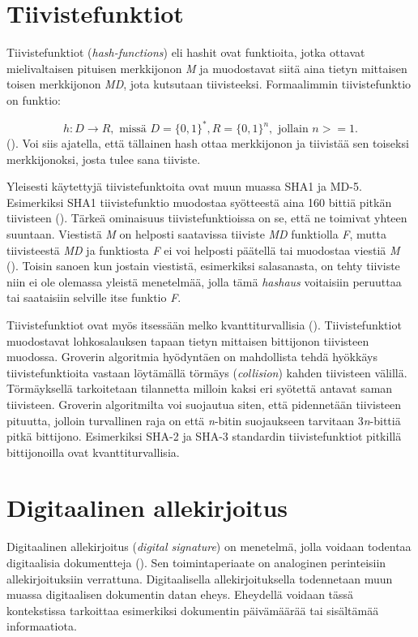  \section{Tiivistefunktiot}
 Tiivistefunktiot (\emph{hash-functions}) eli hashit  ovat funktioita, jotka ottavat mielivaltaisen pituisen merkkijonon \emph{M} ja muodostavat siitä aina tietyn mittaisen toisen merkkijonon \emph{MD}, jota kutsutaan tiivisteeksi. Formaalimmin tiivistefunktio on funktio:
 
 \[h: D \to R, \text{ missä } D = \big\{0,1\big\}^{*}, R = \big\{0,1\big\}^{n}, \text{ jollain } n >= 1.\] (\cite{sobti2012cryptographic}). Voi siis ajatella, että tällainen hash ottaa merkkijonon ja tiivistää sen toiseksi merkkijonoksi, josta tulee sana tiiviste.
 
 Yleisesti käytettyjä tiivistefunktoita ovat muun muassa SHA1 ja MD-5. Esimerkiksi SHA1 tiivistefunktio muodostaa syötteestä aina 160 bittiä pitkän tiivisteen (\cite{bellare2005introduction}). Tärkeä ominaisuus tiivistefunktioissa on se, että ne toimivat yhteen suuntaan. Viestistä \emph{M} on helposti saatavissa tiiviste \emph{MD} funktiolla \emph{F}, mutta tiivisteestä \emph{MD} ja funktiosta \emph{F} ei voi helposti päätellä tai muodostaa viestiä \emph{M} (\cite{bakhtiari1995cryptographic}). Toisin sanoen kun jostain viestistä, esimerkiksi salasanasta, on tehty tiiviste niin ei ole olemassa yleistä menetelmää, jolla tämä \emph{hashaus} voitaisiin peruuttaa tai saataisiin selville itse funktio \emph{F}.
 
 Tiivistefunktiot ovat myös itsessään melko kvanttiturvallisia (\cite{mavroeidis2018impact}). Tiivistefunktiot muodostavat lohkosalauksen tapaan tietyn mittaisen bittijonon tiivisteen muodossa. Groverin algoritmia hyödyntäen on mahdollista tehdä hyökkäys tiivistefunktioita vastaan löytämällä törmäys (\emph{collision}) kahden tiivisteen välillä. Törmäyksellä tarkoitetaan tilannetta milloin kaksi eri syötettä antavat saman tiivisteen. Groverin algoritmilta voi suojautua siten, että pidennetään tiivisteen pituutta, jolloin turvallinen raja on että \emph{n}-bitin suojaukseen tarvitaan 3\emph{n}-bittiä pitkä bittijono. Esimerkiksi SHA-2 ja SHA-3 standardin tiivistefunktiot pitkillä bittijonoilla ovat kvanttiturvallisia.
 
 \section{Digitaalinen allekirjoitus}
 Digitaalinen allekirjoitus (\emph{digital signature}) on menetelmä, jolla voidaan todentaa digitaalisia dokumentteja (\cite{1649003}). Sen toimintaperiaate on analoginen perinteisiin allekirjoituksiin verrattuna. Digitaalisella allekirjoituksella todennetaan muun muassa digitaalisen dokumentin datan eheys. Eheydellä voidaan tässä kontekstissa tarkoittaa esimerkiksi dokumentin päivämäärää tai sisältämää informaatiota.
 
